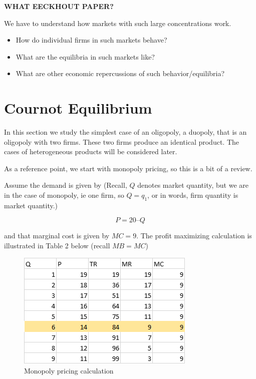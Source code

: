 \documentclass[
]{book}
\providecommand{\tightlist}{%
  \setlength{\itemsep}{0pt}\setlength{\parskip}{0pt}}
\begin{document}
\begin{addition}
\textbf{WHAT EECKHOUT PAPER?}

\end{addition}

We have to understand how markets with such large concentrations work.

\begin{itemize}
\tightlist
\item
  How do individual firms in such markets behave?
\item
  What are the equilibria in such markets like?
\item
  What are other economic repercussions of such behavior/equilibria?
\end{itemize}

\hypertarget{cournot-equilibrium}{%
\section{Cournot Equilibrium}\label{cournot-equilibrium}}

In this section we study the simplest case of an oligopoly, a duopoly, that is an oligopoly with two firms. These two firms produce an identical product. The cases of heterogeneous products will be considered later.

As a reference point, we start with monopoly pricing, so this is a bit of a review.

Assume the demand is given by (Recall, \(Q\) denotes market quantity, but we are in the case of monopoly, ie one firm, so \(Q=q_1\), or in words, firm quantity is market quantity.)

\[P = 20 – Q\]

and that marginal cost is given by \(MC = 9\). The profit maximizing calculation is illustrated in Table 2 below (recall \(MB=MC\))

\begin{figure}

{\centering \includegraphics[width=0.5\linewidth]{img/oligopoly/fig2} 

}

\caption{Monopoly pricing calculation}\label{fig:oligopoly02}
\end{figure}
\end{document}
